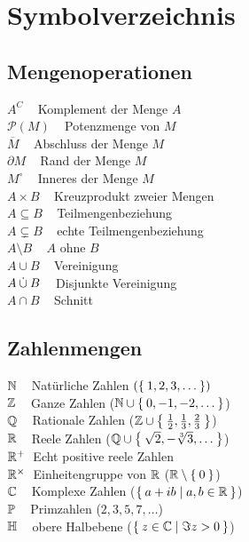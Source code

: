 \chapter*{Symbolverzeichnis}
\begin{minipage}[t]{0.45\textwidth}
\section*{Mengenoperationen}
$A^C\;\;\;$ Komplement der Menge $A$\\
$\mathcal{P}(M)\;\;\;$ Potenzmenge von $M$\\
$\overline{M}\;\;\;$ Abschluss der Menge $M$\\
$\partial M\;\;\;$ Rand der Menge $M$\\
$M^\circ\;\;\;$ Inneres der Menge $M$\\
$A \times B\;\;\;$ Kreuzprodukt zweier Mengen\\
$A \subseteq B\;\;\;$ Teilmengenbeziehung\\
$A \subsetneq B\;\;\;$ echte Teilmengenbeziehung\\
$A \setminus B\;\;\;$ $A$ ohne $B$\\
$A \cup B\;\;\;$ Vereinigung\\
$A \mathbin{\dot{\cup}} B\;\;\;$ Disjunkte Vereinigung\\
$A \cap B\;\;\;$ Schnitt\\
\section*{Zahlenmengen}
$\mathbb{N}\;\;\;$ Natürliche Zahlen $(\Set{1, 2, 3, \dots})$\\
$\mathbb{Z}\;\;\;$ Ganze Zahlen ($\mathbb{N} \cup \Set{0, -1, -2, \dots}$)\\
$\mathbb{Q}\;\;\;$ Rationale Zahlen ($\mathbb{Z} \cup \Set{\frac{1}{2}, \frac{1}{3}, \frac{2}{3}}$)\\
$\mathbb{R}\;\;\;$ Reele Zahlen ($\mathbb{Q} \cup \Set{\sqrt{2}, -\sqrt[3]{3}, \dots}$)\\
$\mathbb{R}^+\;$ Echt positive reele Zahlen\\
$\mathbb{R}^\times\;$ Einheitengruppe von $\mathbb{R}$ ($\mathbb{R} \setminus \Set{0}$)\\
$\mathbb{C}\;\;\;$ Komplexe Zahlen ($\Set{a+ib|a,b \in \ensuremath{\mathbb{R}}}$)\\
$\mathbb{P}\;\;\;$ Primzahlen ($2, 3, 5, 7, \dots$)\\
$\mathbb{H}\;\;\;$ obere Halbebene ($\Set{z \in \ensuremath{\mathbb{C}}| \Im{z} > 0}$)\\


\end{minipage}
